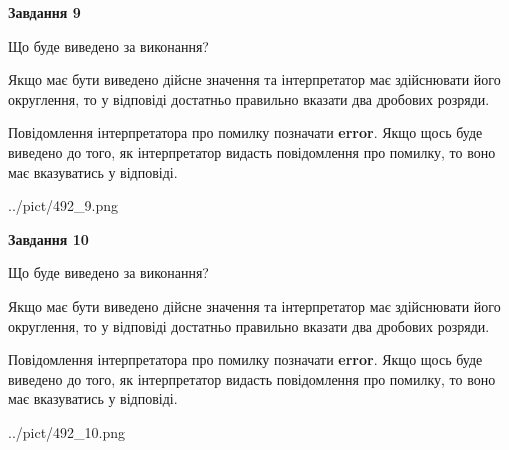 \documentclass[12pt, ukrainian]{article}
\begin{document}
{\begin {Large}
{\begin {center}\textbf{Завдання 9}\end {center}}\par
Що буде виведено за виконання? \par

Якщо має бути виведено дійсне значення та інтерпретатор має здійснювати його округлення, 
то у відповіді достатньо правильно вказати два дробових розряди.

Повідомлення інтерпретатора про помилку позначати \textbf{error}.
Якщо щось буде виведено до того, як інтерпретатор видасть повідомлення про помилку, 
то воно має вказуватись у відповіді. \par

\begin{center}
	{../pict/492_9.png}
\end{center}
\newpage

{\begin {center}\textbf{Завдання 10}\end {center}}\par
Що буде виведено за виконання? \par

Якщо має бути виведено дійсне значення та інтерпретатор має здійснювати його округлення, 
то у відповіді достатньо правильно вказати два дробових розряди.

Повідомлення інтерпретатора про помилку позначати \textbf{error}.
Якщо щось буде виведено до того, як інтерпретатор видасть повідомлення про помилку, 
то воно має вказуватись у відповіді. \par

\begin{center}
	{../pict/492_10.png}
\end{center}
\newpage

\end {Large}}
\end{document}
